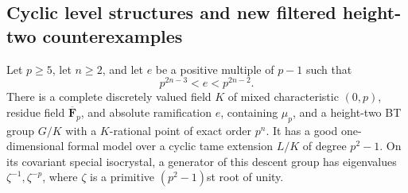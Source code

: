 \subsection{Cyclic level structures and new filtered height-two counterexamples}

\begin{lemma}
\label{lem:B-RD62-arc}
Let $p\ge5$, let $n\ge2$, and let $e$ be a positive multiple of $p-1$
such that
\[
                    p^{2n-3}<e<p^{2n-2}.                 \tag{B-RD62.1}
\]
There is a complete discretely valued field $K$ of mixed characteristic
$(0,p)$, residue field $\overline{\mathbf F}_p$, and absolute ramification
$e$, containing $\mu_p$, and a height-two BT group $G/K$ with a
$K$-rational point of exact order $p^n$.  It has a good one-dimensional
formal model over a cyclic tame extension $L/K$ of degree $p^2-1$.
On its covariant special isocrystal, a generator of this descent group
has eigenvalues $\zeta^{-1},\zeta^{-p}$, where $\zeta$ is a primitive
$(p^2-1)$st root of unity.
\end{lemma}
